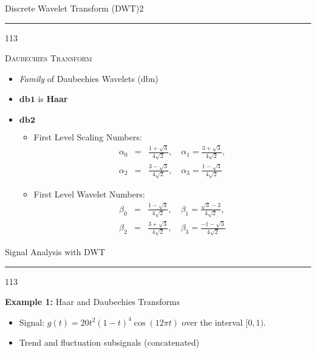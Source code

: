 \documentclass[10pt]{beamer}
\begin{document}
\begin{slide*}
{\large \textsf{Discrete Wavelet Transform (DWT)\hfill{2}}}\\
\hrule
\vspace{10pt}
\begin{dinglist} {113}
\item \textsc{Daubechies Transform}
    \begin{itemize}
    \item \emph{Family} of Daubechies Wavelets (dbn)
    \item $\mathbf{db1}$ is \textbf{Haar}
    \item $\mathbf{db2}$
            \begin{itemize}
            \item First Level Scaling Numbers:
            \begin{eqnarray*}
            \alpha_{0} &=& \frac{1+\sqrt{3}}{4\sqrt{2}}, \quad \alpha_{1}=\frac{3+\sqrt{3}}{4\sqrt{2}}, \\
            \alpha_{2} &=& \frac{3-\sqrt{3}}{4\sqrt{2}}, \quad \alpha_{3}=\frac{1-\sqrt{3}}{4\sqrt{2}}
            \end{eqnarray*}
            \item First Level Wavelet Numbers:
            \begin{eqnarray*}
            \beta_{0} &=& \frac{1-\sqrt{3}}{4\sqrt{2}}, \quad \beta_{1}=\frac{\sqrt{3}-3}{4\sqrt{2}}, \\
            \beta_{2} &=& \frac{3+\sqrt{3}}{4\sqrt{2}}, \quad \beta_{3}=\frac{-1-\sqrt{3}}{4\sqrt{2}}
            \end{eqnarray*}
            \end{itemize}
    \end{itemize}
\end{dinglist}
\end{slide*}

\begin{slide*}
{\large \textsf{Signal Analysis with DWT}}\\
\hrule
\vspace{10pt}
\begin{dinglist} {113}
\item \textbf{Example 1:} Haar and Daubechies Transforms
    \begin{itemize}
    \item Signal: $g(t)=20t^{2}(1-t)^{4}\cos(12\pi t)$ over the interval $[0,1)$. 
    \item Trend and fluctuation subsignals (concatenated) 
    \end{itemize}
\end{dinglist}
\end{slide*}
\end{document}
